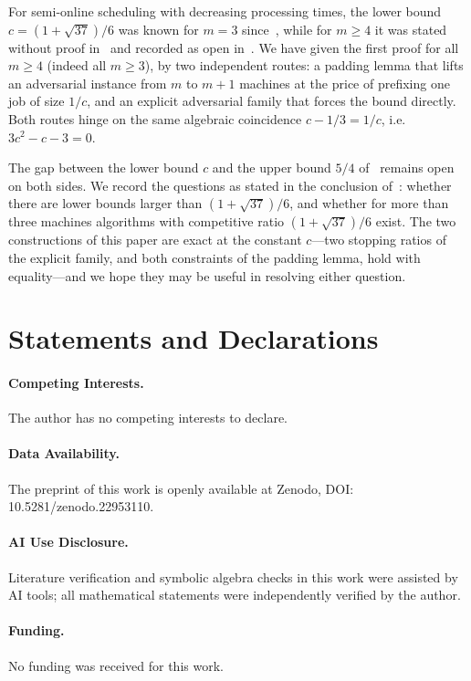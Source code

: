 \documentclass[11pt]{article}
\theoremstyle{definition}
\begin{document}
For semi-online scheduling with decreasing processing times, the lower
bound $c=(1+\sqrt{37})/6$ was known for $m=3$ since~\cite{SSW00}, while
for $m\ge4$ it was stated without proof in~\cite{CKK12} and recorded as
open in~\cite{Eps18}. We have given the first proof for all $m\ge4$ (indeed
all $m\ge3$), by two independent routes: a padding lemma that lifts an
adversarial instance from $m$ to $m+1$ machines at the price of prefixing
one job of size $1/c$, and an explicit adversarial family that forces the
bound directly. Both routes hinge on the same algebraic coincidence
$c-1/3=1/c$, i.e.\ $3c^{2}-c-3=0$.

The gap between the lower bound $c$ and the upper bound $5/4$
of~\cite{CKK12} remains open on both sides. We record the questions as
stated in the conclusion of~\cite{CKK12}: whether there are lower bounds
larger than $(1+\sqrt{37})/6$, and whether for more than three machines
algorithms with competitive ratio $(1+\sqrt{37})/6$ exist. The two
constructions of this paper are exact at the constant $c$---two stopping
ratios of the explicit family, and both constraints of the padding lemma,
hold with equality---and we hope they may be useful in resolving either
question.




\section*{Statements and Declarations}

\paragraph{Competing Interests.}
The author has no competing interests to declare.

\paragraph{Data Availability.}
The preprint of this work is openly available at Zenodo, DOI: 10.5281/zenodo.22953110.

\paragraph{AI Use Disclosure.}
Literature verification and symbolic algebra checks in this work were
assisted by AI tools; all mathematical statements were independently
verified by the author.

\paragraph{Funding.}
No funding was received for this work.
\end{document}
